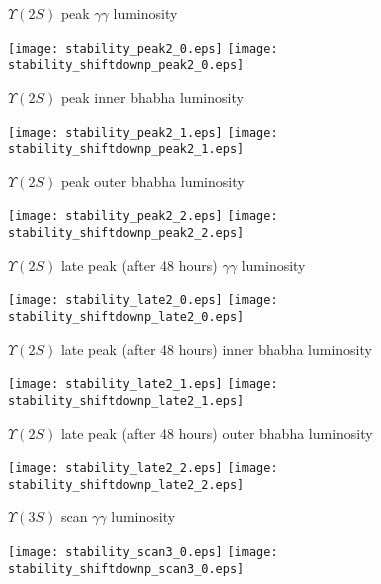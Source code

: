 \documentclass[12pt]{article}
\begin{document}
\pagebreak

$\Upsilon(2S)$ peak $\gamma\gamma$ luminosity

\begin{center}
\texttt{[image: stability\_peak2\_0.eps]} \texttt{[image: stability\_shiftdownp\_peak2\_0.eps]}
\end{center}


\vfill $\Upsilon(2S)$ peak inner bhabha luminosity

\begin{center}
\texttt{[image: stability\_peak2\_1.eps]} \texttt{[image: stability\_shiftdownp\_peak2\_1.eps]}
\end{center}


\vfill $\Upsilon(2S)$ peak outer bhabha luminosity

\begin{center}
\texttt{[image: stability\_peak2\_2.eps]} \texttt{[image: stability\_shiftdownp\_peak2\_2.eps]}
\end{center}

\pagebreak

$\Upsilon(2S)$ late peak (after 48 hours) $\gamma\gamma$ luminosity

\begin{center}
\texttt{[image: stability\_late2\_0.eps]} \texttt{[image: stability\_shiftdownp\_late2\_0.eps]}
\end{center}


\vfill $\Upsilon(2S)$ late peak (after 48 hours) inner bhabha luminosity

\begin{center}
\texttt{[image: stability\_late2\_1.eps]} \texttt{[image: stability\_shiftdownp\_late2\_1.eps]}
\end{center}


\vfill $\Upsilon(2S)$ late peak (after 48 hours) outer bhabha luminosity

\begin{center}
\texttt{[image: stability\_late2\_2.eps]} \texttt{[image: stability\_shiftdownp\_late2\_2.eps]}
\end{center}

\pagebreak

$\Upsilon(3S)$ scan $\gamma\gamma$ luminosity

\begin{center}
\texttt{[image: stability\_scan3\_0.eps]} \texttt{[image: stability\_shiftdownp\_scan3\_0.eps]}
\end{center}
\end{document}
